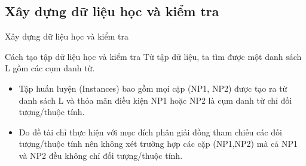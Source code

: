 \documentclass{beamer}
\begin{document}
	\subsection{Xây dựng dữ liệu học và kiểm tra}
	\begin{frame}{Xây dựng dữ liệu học và kiểm tra}		
		\begin{block}{Cách tạo tập dữ liệu học và kiểm tra}
			Từ tập dữ liệu, ta tìm được một danh sách L gồm các cụm danh từ. 
			\begin{itemize}
				\item{Tập huấn luyện (Instances) bao gồm mọi cặp (NP1, NP2) được tạo ra từ danh sách L và thỏa mãn điều kiện NP1 hoặc NP2 là cụm danh từ chỉ đối tượng/thuộc tính.}
				\item{Do đề tài chỉ thực hiện với mục đích phân giải đồng tham chiếu các đối tượng/thuộc tính nên không xét trường hợp các cặp (NP1,NP2) mà cả NP1 và NP2 đều không chỉ đối tượng/thuộc tính.}
			\end{itemize}
		\end{block}
	\end{frame}	
\end{document}
